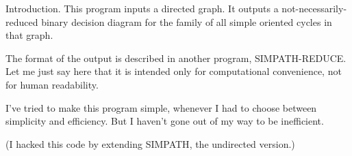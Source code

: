 
\hypertextrue\srcloctrue
\datethis




Introduction. This program inputs a
directed graph.
It outputs a not-necessarily-reduced binary decision diagram
for the family of all simple oriented cycles in that graph.

The format of the output is described in another program,
{\mc SIMPATH-REDUCE}. Let me just say here that it is intended
only for computational convenience, not for human readability.

I've tried to make this program simple, whenever I had to
choose between simplicity and efficiency. But I haven't gone
out of my way to be inefficient.

(I hacked this code by extending {\mc SIMPATH}, the undirected version.)

